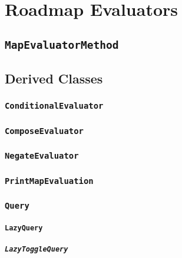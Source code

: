 \chapter{Roadmap Evaluators}

\section{\texttt{MapEvaluatorMethod}}

\section{Derived Classes}

\subsection{\texttt{ConditionalEvaluator}}

\subsection{\texttt{ComposeEvaluator}}

\subsection{\texttt{NegateEvaluator}}

\subsection{\texttt{PrintMapEvaluation}}

\subsection{\texttt{Query}}

\subsubsection{\texttt{LazyQuery}}

\paragraph{\texttt{LazyToggleQuery}}

